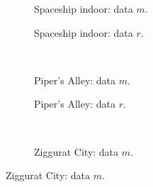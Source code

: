\begin{figure}[p]\ContinuedFloat
  \begin{adjustbox}{minipage=\textwidth, scale=0.6}
    \begin{subfigure}[b]{0.7\textwidth}
      \centering
      \def\svgwidth{\textwidth}
      
      \caption{Spaceship indoor: data $m$.}
      \label{fig:hs-nodesize-memory::si-dm}
    \end{subfigure}
  \end{adjustbox} %
  \begin{adjustbox}{minipage=\textwidth, scale=0.6}
    \begin{subfigure}[b]{0.7\textwidth}
      \centering
      \def\svgwidth{\textwidth}
      
      \caption{Spaceship indoor: data $r$.}
      \label{fig:hs-nodesize-::si-dr}
    \end{subfigure}
  \end{adjustbox} \\
  \begin{adjustbox}{minipage=\textwidth, scale=0.6}
    \begin{subfigure}[b]{0.7\textwidth}
      \centering
      \def\svgwidth{\textwidth}
      
      \caption{Piper's Alley: data $m$.}
      \label{fig:hs-nodesize-memory::pa-dm}
    \end{subfigure}
  \end{adjustbox} %
  \begin{adjustbox}{minipage=\textwidth, scale=0.6}
    \begin{subfigure}[b]{0.7\textwidth}
      \centering
      \def\svgwidth{\textwidth}
      
      \caption{Piper's Alley: data $r$.}
      \label{fig:hs-nodesize-::pa-dr}
    \end{subfigure}
  \end{adjustbox} \\
  \begin{adjustbox}{minipage=\textwidth, scale=0.6}
    \begin{subfigure}[b]{0.7\textwidth}
      \centering
      \def\svgwidth{\textwidth}
      
      \caption{Ziggurat City: data $m$.}
      \label{fig:hs-nodesize-memory::zc-dm}
    \end{subfigure}

\end{adjustbox}
\end{figure}
